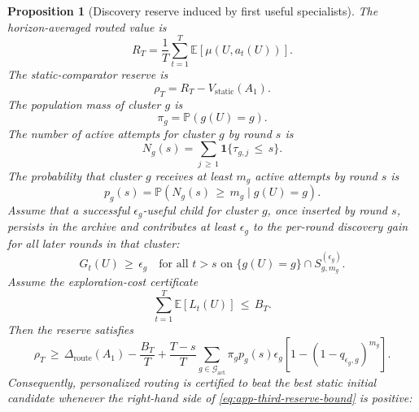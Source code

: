 \documentclass{article} %
\newtheorem{proposition}[theorem]{Proposition}
\begin{document}
\begin{proposition}[Discovery reserve induced by first useful specialists]
\label{prop:4}
The horizon-averaged routed value is
\begin{equation}
\label{eq:app-third-reserve-rt}
R_T
=
\frac{1}{T}
\sum_{t=1}^{T}
\mathbb{E}[\mu(U,a_t(U))].
\end{equation}
The static-comparator reserve is
\begin{equation}
\label{eq:app-third-reserve-rho}
\rho_T
=
R_T
-
V_{\mathrm{static}}(A_1).
\end{equation}
The population mass of cluster \(g\) is
\begin{equation}
\label{eq:app-third-reserve-pi}
\pi_g
=
\mathbb{P}(g(U)=g).
\end{equation}
The number of active attempts for cluster \(g\) by round \(s\) is
\begin{equation}
\label{eq:app-third-reserve-ng}
N_g(s)
=
\sum_{j\,\ge\, 1}
\mathbf{1}\{\tau_{g,j}\,\le\, s\}.
\end{equation}
The probability that cluster \(g\) receives at least \(m_g\) active attempts by round \(s\) is
\begin{equation}
\label{eq:app-third-reserve-pg}
p_g(s)
=
\mathbb{P}\!\left(
N_g(s)\,\ge\, m_g
\mid
g(U)=g
\right).
\end{equation}
Assume that a successful \(\epsilon_g\)-useful child for cluster \(g\), once inserted by round \(s\), persists in the archive and contributes at least \(\epsilon_g\) to the per-round discovery gain for all later rounds in that cluster:
\begin{equation}
\label{eq:app-third-reserve-persistence}
G_t(U)
\,\ge\,
\epsilon_g
\quad
\text{for all }t>s
\text{ on }
\{g(U)=g\}\cap S_{g,m_g}^{(\epsilon_g)}.
\end{equation}
Assume the exploration-cost certificate
\begin{equation}
\label{eq:app-third-reserve-tax}
\sum_{t=1}^{T}
\mathbb{E}[L_t(U)]
\,\le\,
B_T.
\end{equation}
Then the reserve satisfies
\begin{equation}
\label{eq:app-third-reserve-bound}
\rho_T
\,\ge\,
\Delta_{\mathrm{route}}(A_1)
-
\frac{B_T}{T}
+
\frac{T-s}{T}
\sum_{g\in\mathcal{G}_{\mathrm{act}}}
\pi_g
p_g(s)
\epsilon_g
\left[
1-(1-q_{\epsilon_g,g})^{m_g}
\right].
\end{equation}
Consequently, personalized routing is certified to beat the best static initial candidate whenever the right-hand side of \eqref{eq:app-third-reserve-bound} is positive:

\end{proposition}
\end{document}
